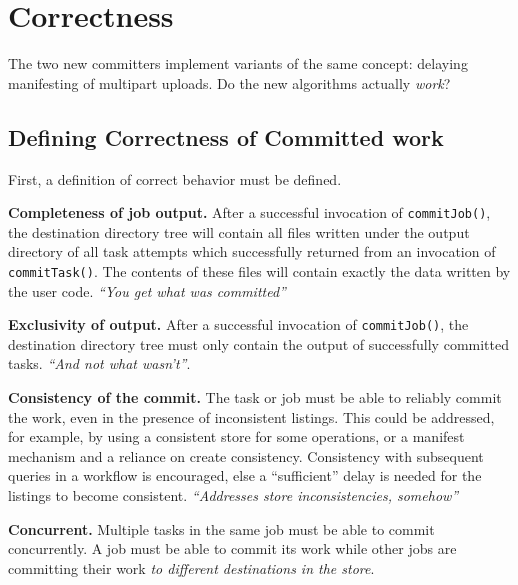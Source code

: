 \documentclass[conference]{IEEEtran}
\begin{document}
\section{Correctness}
\label{sec:correctness}

The two new committers implement variants of the same concept: delaying
manifesting of multipart uploads.
Do the new algorithms actually \emph{work}?


\subsection{Defining Correctness of Committed work}

First, a definition of correct behavior must be defined.

  \textbf{Completeness of job output.}
  After a successful invocation of \texttt{commitJob()},
  the destination directory tree will contain all files written under the output directory
  of all task attempts which successfully returned from an invocation of \texttt{commitTask()}.
  The contents of these files will contain exactly the data written by the user code.
  \emph{``You get what was committed''}

  \textbf{Exclusivity of output.}
  After a successful invocation of \texttt{commitJob()},
  the destination directory tree must only contain the output of successfully
  committed tasks.
  \emph{``And not what wasn't''}.

  \textbf{Consistency of the commit.}
  The task or job must be able to reliably commit the work, even in the presence
  of inconsistent listings.
  This could be addressed, for example, by using a consistent store for some operations,
  or a manifest mechanism and a reliance on create consistency.
  Consistency with subsequent queries in a workflow is encouraged, else a ``sufficient''
  delay is needed for the listings to become consistent.
  \emph{``Addresses store inconsistencies, somehow''}

  \textbf{Concurrent.}
  Multiple tasks in the same job must be able to commit concurrently.
  A job must be able to commit its work while other jobs are committing
  their work \emph{to different destinations in the store}.
\end{document}
